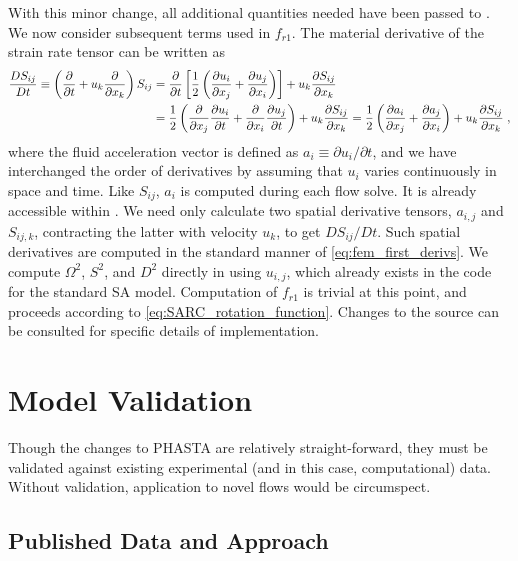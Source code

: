 \documentclass[11pt]{article}
\begin{document}
With this minor change, all additional quantities needed have been passed to . We now consider subsequent terms used in $f_{r1}$. The material derivative of the strain rate tensor can be written as
\begin{equation}
\begin{aligned}
\frac{DS_{ij}}{Dt}
\equiv
\left( \frac{\partial}{\partial t} + u_k \frac{\partial}{\partial x_k} \right) S_{ij}
&=
\frac{\partial}{\partial t}
\left[
\frac{1}{2}
\left( \frac{\partial u_i}{\partial x_j} + \frac{\partial u_j}{\partial x_i} \right)
\right]
+
u_k \frac{\partial S_{ij}}{\partial x_k}
\\
&=
\frac{1}{2}
\left( \frac{\partial}{\partial x_j} \frac{\partial u_i}{\partial t} + \frac{\partial}{\partial x_i} \frac{\partial u_j}{\partial t} \right)
+
u_k \frac{\partial S_{ij}}{\partial x_k}
=
\frac{1}{2}
\left( \frac{\partial a_i}{\partial x_j} + \frac{\partial a_j}{\partial x_i} \right)
+
u_k \frac{\partial S_{ij}}{\partial x_k}
\;,
\end{aligned}
\end{equation}
where the fluid acceleration vector is defined as $a_i \equiv \partial u_i / \partial t$, and we have interchanged the order of derivatives by assuming that $u_i$ varies continuously in space and time. Like $S_{ij}$, $a_i$ is computed during each flow solve. It is already accessible within . We need only calculate two spatial derivative tensors, $a_{i,j}$ and $S_{ij,k}$, contracting the latter with velocity $u_k$, to get $DS_{ij}/Dt$. Such spatial derivatives are computed in the standard manner of \eqref{eq:fem_first_derivs}. We compute $\Omega^2$, $S^2$, and $D^2$ directly in  using $u_{i,j}$, which already exists in the code for the standard SA model. Computation of $f_{r1}$ is trivial at this point, and proceeds according to \eqref{eq:SARC_rotation_function}. Changes to the source can be consulted for specific details of implementation.

\section{Model Validation} %

Though the changes to PHASTA are relatively straight-forward, they must be validated against existing experimental (and in this case, computational) data. Without validation, application to novel flows would be circumspect.

\subsection{Published Data and Approach}
\end{document}
